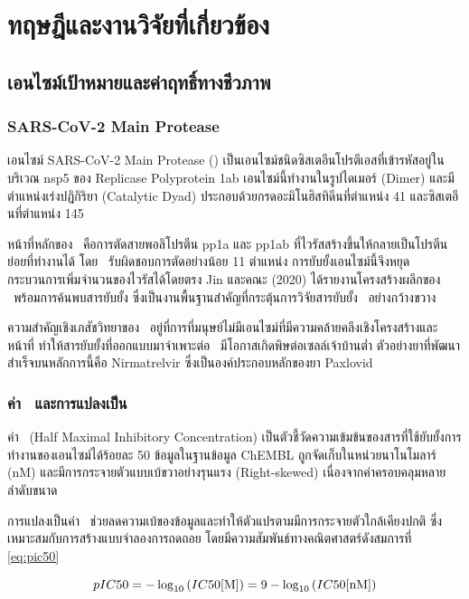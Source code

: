 \chapter{ทฤษฎีและงานวิจัยที่เกี่ยวข้อง}

\section{เอนไซม์เป้าหมายและค่าฤทธิ์ทางชีวภาพ}

\subsection{SARS-CoV-2 Main Protease}

เอนไซม์ SARS-CoV-2 Main Protease (\Mpro) เป็นเอนไซม์ชนิดซิสเตอีนโปรตีเอสที่เข้ารหัสอยู่ในบริเวณ nsp5 ของ Replicase Polyprotein 1ab เอนไซม์นี้ทำงานในรูปไดเมอร์ (Dimer) และมีตำแหน่งเร่งปฏิกิริยา (Catalytic Dyad) ประกอบด้วยกรดอะมิโนฮิสทิดีนที่ตำแหน่ง 41 และซิสเตอีนที่ตำแหน่ง 145

หน้าที่หลักของ \Mpro\ คือการตัดสายพอลิโปรตีน pp1a และ pp1ab ที่ไวรัสสร้างขึ้นให้กลายเป็นโปรตีนย่อยที่ทำงานได้ โดย \Mpro\ รับผิดชอบการตัดอย่างน้อย 11 ตำแหน่ง การยับยั้งเอนไซม์นี้จึงหยุดกระบวนการเพิ่มจำนวนของไวรัสได้โดยตรง Jin และคณะ (2020) ได้รายงานโครงสร้างผลึกของ \Mpro\ พร้อมการค้นพบสารยับยั้ง ซึ่งเป็นงานพื้นฐานสำคัญที่กระตุ้นการวิจัยสารยับยั้ง \Mpro\ อย่างกว้างขวาง

ความสำคัญเชิงเภสัชวิทยาของ \Mpro\ อยู่ที่การที่มนุษย์ไม่มีเอนไซม์ที่มีความคล้ายคลึงเชิงโครงสร้างและหน้าที่ ทำให้สารยับยั้งที่ออกแบบมาจำเพาะต่อ \Mpro\ มีโอกาสเกิดพิษต่อเซลล์เจ้าบ้านต่ำ ตัวอย่างยาที่พัฒนาสำเร็จบนหลักการนี้คือ Nirmatrelvir ซึ่งเป็นองค์ประกอบหลักของยา Paxlovid

\subsection{ค่า \ICfifty\ และการแปลงเป็น \pICfifty}

ค่า \ICfifty\ (Half Maximal Inhibitory Concentration) เป็นตัวชี้วัดความเข้มข้นของสารที่ใช้ยับยั้งการทำงานของเอนไซม์ได้ร้อยละ 50 ข้อมูลในฐานข้อมูล ChEMBL ถูกจัดเก็บในหน่วยนาโนโมลาร์ (nM) และมีการกระจายตัวแบบเบ้ขวาอย่างรุนแรง (Right-skewed) เนื่องจากค่าครอบคลุมหลายลำดับขนาด

การแปลงเป็นค่า \pICfifty\ ช่วยลดความเบ้ของข้อมูลและทำให้ตัวแปรตามมีการกระจายตัวใกล้เคียงปกติ ซึ่งเหมาะสมกับการสร้างแบบจำลองการถดถอย โดยมีความสัมพันธ์ทางคณิตศาสตร์ดังสมการที่ \ref{eq:pic50}

\begin{equation}
pIC50 = -\log_{10}\left(IC50[\mathrm{M}]\right) = 9 - \log_{10}\left(IC50[\mathrm{nM}]\right)
\label{eq:pic50}
\end{equation}

